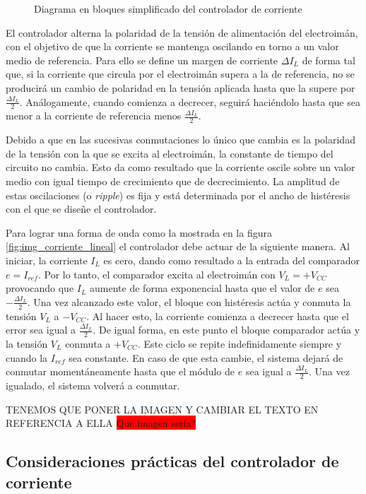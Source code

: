 \begin{figure}[H]
	\centering
	
	\caption{Diagrama en bloques simplificado del controlador de corriente}	\label{fig:img_diag-en-bloques}
\end{figure}

El controlador alterna la polaridad de la tensión de alimentación del electroimán, con el objetivo de que la corriente se mantenga oscilando en torno a un valor medio de referencia. Para ello se define un margen de corriente $\Delta I_L$ de forma tal que, si la corriente que circula por el electroimán supera a la de referencia, no se producirá un cambio de polaridad en la tensión aplicada hasta que la supere por $\frac{\Delta I_L}{2}$. Análogamente, cuando comienza a decrecer, seguirá haciéndolo hasta que sea menor a la corriente de referencia menos $\frac{\Delta I_L}{2}$.

Debido a que en las sucesivas conmutaciones lo único que cambia es la polaridad de la tensión con la que se excita al electroimán, la constante de tiempo del circuito no cambia. Esto da como resultado que la corriente oscile sobre un valor medio con igual tiempo de crecimiento que de decrecimiento. La amplitud de estas oscilaciones (o \textsl{ripple}) es fija y está determinada por el ancho de histéresis con el que se diseñe el controlador.

Para lograr una forma de onda como la mostrada en la  figura \ref{fig:img_corriente_lineal} el controlador debe actuar de la siguiente manera. Al iniciar, la corriente $I_L$ es cero, dando como resultado a la entrada del comparador  $e = I_{ref}$. Por lo tanto, el comparador excita al electroimán con $V_L=+V_{CC}$ provocando que $I_L$ aumente de forma exponencial hasta que el valor de $e$ sea $-\frac{\Delta I_L}{2}$. Una vez alcanzado este valor, el bloque con histéresis actúa y conmuta la tensión $V_L$ a $-V_{CC}$. Al hacer esto, la corriente comienza a decrecer hasta que el error sea igual a $\frac{\Delta I_L}{2}$. De igual forma, en este punto el bloque comparador actúa y la tensión $V_L$ conmuta a $+V_{CC}$. Este ciclo se repite indefinidamente siempre y cuando la $I_{ref}$ sea constante. En caso de que esta cambie, el sistema dejará de conmutar momentáneamente hasta que el módulo de $e$ sea igual a $\frac{\Delta I_L}{2}$. Una vez igualado, el sistema volverá a conmutar.

TENEMOS QUE PONER LA IMAGEN Y CAMBIAR EL TEXTO EN REFERENCIA A ELLA
\colorbox{red}{Que imagen sería?}

\subsection{Consideraciones prácticas del controlador de corriente}

